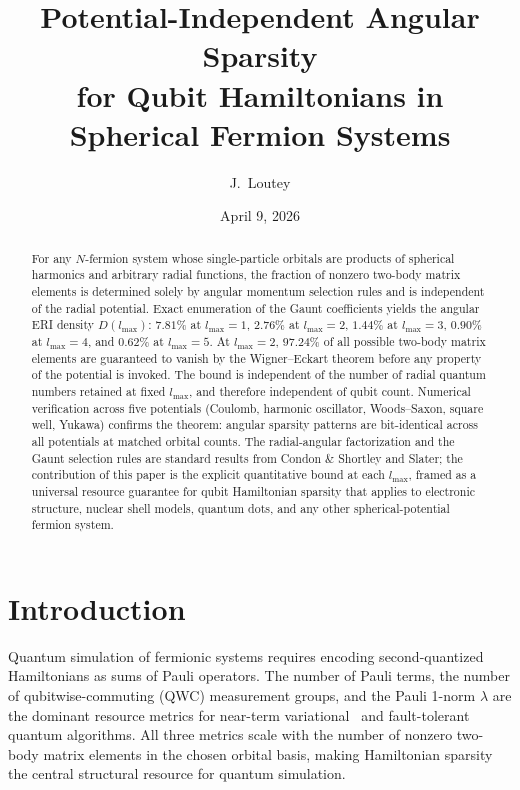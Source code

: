 \documentclass[twocolumn,pra,amsmath,amssymb,superscriptaddress]{revtex4-2}
\begin{document}
\title{Potential-Independent Angular Sparsity\\for Qubit Hamiltonians in Spherical Fermion Systems}

\author{J.~Loutey}

\date{April 9, 2026}

\begin{abstract}
For any $N$-fermion system whose single-particle orbitals are products
of spherical harmonics and arbitrary radial functions, the fraction of
nonzero two-body matrix elements is determined solely by angular
momentum selection rules and is independent of the radial potential.
Exact enumeration of the Gaunt coefficients yields the angular ERI
density $D(l_{\max})$: $7.81\%$ at $l_{\max}=1$, $2.76\%$ at
$l_{\max}=2$, $1.44\%$ at $l_{\max}=3$, $0.90\%$ at $l_{\max}=4$, and
$0.62\%$ at $l_{\max}=5$.  At $l_{\max}=2$, $97.24\%$ of all possible
two-body matrix elements are guaranteed to vanish by the
Wigner--Eckart theorem before any property of the potential is
invoked.  The bound is independent of the number of radial quantum
numbers retained at fixed $l_{\max}$, and therefore independent of
qubit count.  Numerical verification across five potentials (Coulomb,
harmonic oscillator, Woods--Saxon, square well, Yukawa) confirms the
theorem: angular sparsity patterns are bit-identical across all
potentials at matched orbital counts.  The radial-angular
factorization and the Gaunt selection rules are standard results from
Condon \& Shortley and Slater; the contribution of this paper is the
explicit quantitative bound at each $l_{\max}$, framed as a universal
resource guarantee for qubit Hamiltonian sparsity that applies to
electronic structure, nuclear shell models, quantum dots, and any
other spherical-potential fermion system.
\end{abstract}

\maketitle

\section{Introduction}
\label{sec:intro}

Quantum simulation of fermionic systems requires encoding
second-quantized Hamiltonians as sums of Pauli operators.  The
number of Pauli terms, the number of qubitwise-commuting (QWC)
measurement groups, and the Pauli 1-norm $\lambda$ are the dominant
resource metrics for near-term variational~\cite{Peruzzo2014} and
fault-tolerant~\cite{Lee2021} quantum algorithms.  All three metrics
scale with the number of nonzero two-body matrix elements in the
chosen orbital basis, making Hamiltonian sparsity the central
structural resource for quantum simulation.
\end{document}
